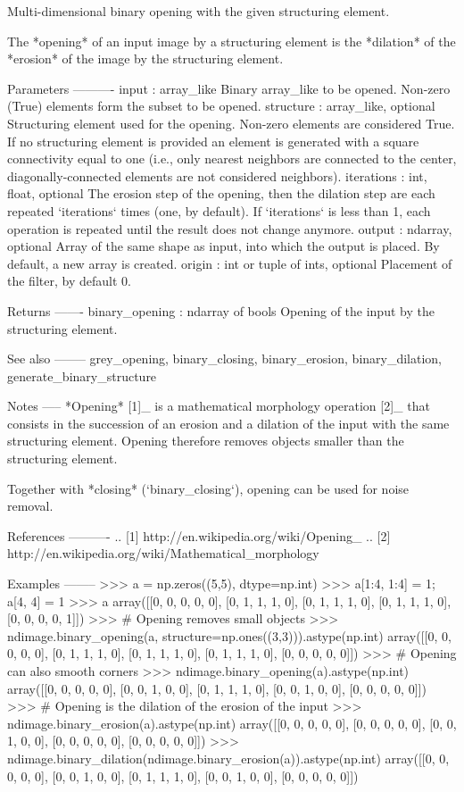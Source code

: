 \begin{DoxyVerb}Multi-dimensional binary opening with the given structuring element.

The *opening* of an input image by a structuring element is the
*dilation* of the *erosion* of the image by the structuring element.

Parameters
----------
input : array_like
    Binary array_like to be opened. Non-zero (True) elements form
    the subset to be opened.
structure : array_like, optional
    Structuring element used for the opening. Non-zero elements are
    considered True. If no structuring element is provided an element
    is generated with a square connectivity equal to one (i.e., only
    nearest neighbors are connected to the center, diagonally-connected
    elements are not considered neighbors).
iterations : {int, float}, optional
    The erosion step of the opening, then the dilation step are each
    repeated `iterations` times (one, by default). If `iterations` is
    less than 1, each operation is repeated until the result does
    not change anymore.
output : ndarray, optional
    Array of the same shape as input, into which the output is placed.
    By default, a new array is created.
origin : int or tuple of ints, optional
    Placement of the filter, by default 0.

Returns
-------
binary_opening : ndarray of bools
    Opening of the input by the structuring element.

See also
--------
grey_opening, binary_closing, binary_erosion, binary_dilation,
generate_binary_structure

Notes
-----
*Opening* [1]_ is a mathematical morphology operation [2]_ that
consists in the succession of an erosion and a dilation of the
input with the same structuring element. Opening therefore removes
objects smaller than the structuring element.

Together with *closing* (`binary_closing`), opening can be used for
noise removal.

References
----------
.. [1] http://en.wikipedia.org/wiki/Opening_%
.. [2] http://en.wikipedia.org/wiki/Mathematical_morphology

Examples
--------
>>> a = np.zeros((5,5), dtype=np.int)
>>> a[1:4, 1:4] = 1; a[4, 4] = 1
>>> a
array([[0, 0, 0, 0, 0],
       [0, 1, 1, 1, 0],
       [0, 1, 1, 1, 0],
       [0, 1, 1, 1, 0],
       [0, 0, 0, 0, 1]])
>>> # Opening removes small objects
>>> ndimage.binary_opening(a, structure=np.ones((3,3))).astype(np.int)
array([[0, 0, 0, 0, 0],
       [0, 1, 1, 1, 0],
       [0, 1, 1, 1, 0],
       [0, 1, 1, 1, 0],
       [0, 0, 0, 0, 0]])
>>> # Opening can also smooth corners
>>> ndimage.binary_opening(a).astype(np.int)
array([[0, 0, 0, 0, 0],
       [0, 0, 1, 0, 0],
       [0, 1, 1, 1, 0],
       [0, 0, 1, 0, 0],
       [0, 0, 0, 0, 0]])
>>> # Opening is the dilation of the erosion of the input
>>> ndimage.binary_erosion(a).astype(np.int)
array([[0, 0, 0, 0, 0],
       [0, 0, 0, 0, 0],
       [0, 0, 1, 0, 0],
       [0, 0, 0, 0, 0],
       [0, 0, 0, 0, 0]])
>>> ndimage.binary_dilation(ndimage.binary_erosion(a)).astype(np.int)
array([[0, 0, 0, 0, 0],
       [0, 0, 1, 0, 0],
       [0, 1, 1, 1, 0],
       [0, 0, 1, 0, 0],
       [0, 0, 0, 0, 0]])\end{DoxyVerb}
